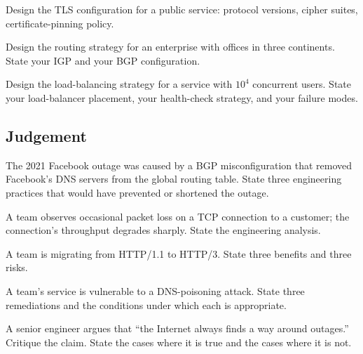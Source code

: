 \begin{exercise}
Design the TLS configuration for a public service: protocol versions, cipher suites, certificate-pinning policy.
\end{exercise}

\begin{exercise}
Design the routing strategy for an enterprise with offices in three continents. State your IGP and your BGP configuration.
\end{exercise}

\begin{exercise}
Design the load-balancing strategy for a service with $10^4$ concurrent users. State your load-balancer placement, your health-check strategy, and your failure modes.
\end{exercise}

\subsection*{Judgement}

\begin{exercise}
The 2021 Facebook outage was caused by a BGP misconfiguration that removed Facebook's DNS servers from the global routing table. State three engineering practices that would have prevented or shortened the outage.
\end{exercise}

\begin{exercise}
A team observes occasional packet loss on a TCP connection to a customer; the connection's throughput degrades sharply. State the engineering analysis.
\end{exercise}

\begin{exercise}
A team is migrating from HTTP/1.1 to HTTP/3. State three benefits and three risks.
\end{exercise}

\begin{exercise}
A team's service is vulnerable to a DNS-poisoning attack. State three remediations and the conditions under which each is appropriate.
\end{exercise}

\begin{exercise}
A senior engineer argues that ``the Internet always finds a way around outages.'' Critique the claim. State the cases where it is true and the cases where it is not.
\end{exercise}


